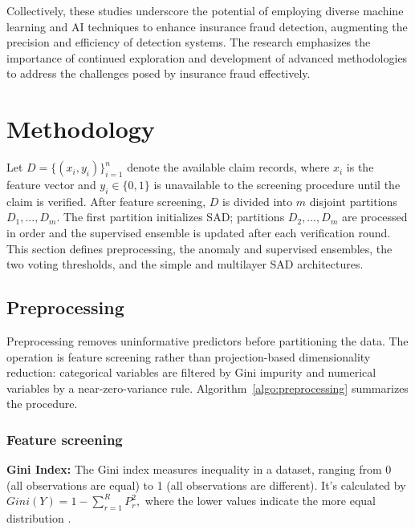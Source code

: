\documentclass[12pt]{article}
\begin{document}
Collectively, these studies underscore the potential of employing
diverse machine learning and AI techniques to enhance insurance
fraud detection, augmenting the precision and efficiency of
detection systems. The research emphasizes the importance of
continued exploration and development of advanced methodologies to
address the challenges posed by insurance fraud effectively.


\fi
\section{Methodology}\label{SC:METHOD}
Let $D=\{(x_i,y_i)\}_{i=1}^{n}$ denote the available claim records, where
$x_i$ is the feature vector and $y_i\in\{0,1\}$ is unavailable to the
screening procedure until the claim is verified. After feature screening,
$D$ is divided into $m$ disjoint partitions $D_1,\ldots,D_m$. The first
partition initializes SAD; partitions $D_2,\ldots,D_m$ are processed in order
and the supervised ensemble is updated after each verification round. This
section defines preprocessing, the anomaly and supervised ensembles, the two
voting thresholds, and the simple and multilayer SAD architectures.

\subsection{Preprocessing}\label{SSC:PreProcessing}
Preprocessing removes uninformative predictors before partitioning the data.
The operation is feature screening rather than projection-based dimensionality
reduction: categorical variables are filtered by Gini impurity and numerical
variables by a near-zero-variance rule. Algorithm~\ref{algo:preprocessing}
summarizes the procedure.
\subsubsection*{Feature screening}

\textbf{\small Gini Index:} The Gini index measures inequality in
a dataset, ranging from 0 (all observations are equal) to 1 (all
observations are different). It's calculated by $Gini(Y) = 1 -
\displaystyle\sum_{r=1}^{R} P_r^2,$ where the lower values
indicate the more equal distribution \cite{A59}.
\end{document}
